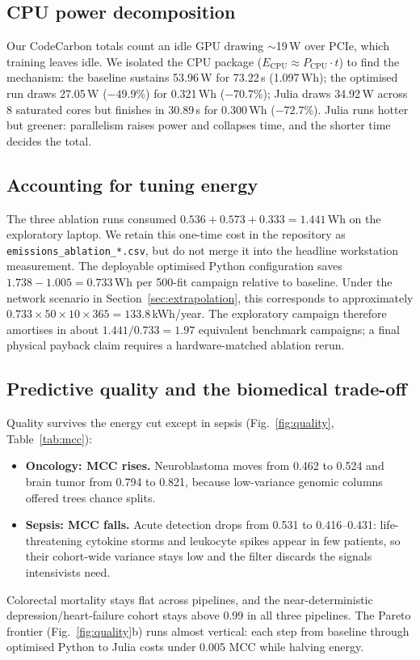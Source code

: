 \documentclass[11pt,a4paper]{article}
\newcommand{\code}[1]{\texttt{\small\color{primarydark}#1}}
\begin{document}
\subsection{CPU power decomposition}
Our CodeCarbon totals count an idle GPU drawing $\sim$19\,W over PCIe, which
training leaves idle. We isolated the CPU package ($E_{\mathrm{CPU}}\approx
P_{\mathrm{CPU}}\cdot t$) to find the mechanism: the baseline sustains
53.96\,W for 73.22\,s (1.097\,Wh); the optimised run draws 27.05\,W
($-49.9$\%) for 0.321\,Wh ($-70.7$\%); Julia draws 34.92\,W across 8 saturated
cores but finishes in 30.89\,s for 0.300\,Wh ($-72.7$\%). Julia runs hotter
but greener: parallelism raises power and collapses time, and the shorter time
decides the total.

\subsection{Accounting for tuning energy}
The three ablation runs consumed $0.536+0.573+0.333=1.441$\,Wh on the
exploratory laptop. We retain this one-time cost in the repository as
\code{emissions\_ablation\_*.csv}, but do not merge it into the headline
workstation measurement. The deployable optimised Python configuration saves
$1.738-1.005=0.733$\,Wh per 500-fit campaign relative to baseline. Under the
network scenario in Section~\ref{sec:extrapolation}, this corresponds to
approximately $0.733\times50\times10\times365=133.8$\,kWh/year. The
exploratory campaign therefore amortises in about $1.441/0.733=1.97$
equivalent benchmark campaigns; a final physical payback claim requires a
hardware-matched ablation rerun.

\subsection{Predictive quality and the biomedical trade-off}
Quality survives the energy cut except in sepsis (Fig.~\ref{fig:quality}, Table~\ref{tab:mcc}):
\begin{itemize}
\item \textbf{Oncology: MCC rises.} Neuroblastoma moves from 0.462 to 0.524 and brain tumor from 0.794 to 0.821, because low-variance genomic columns offered trees chance splits.
\item \textbf{Sepsis: MCC falls.} Acute detection drops from 0.531 to 0.416--0.431: life-threatening cytokine storms and leukocyte spikes appear in few patients, so their cohort-wide variance stays low and the filter discards the signals intensivists need.
\end{itemize}
Colorectal mortality stays flat across pipelines, and the near-deterministic depression/heart-failure cohort stays above 0.99 in all three pipelines. The Pareto frontier (Fig.~\ref{fig:quality}b) runs almost vertical: each step from baseline through optimised Python to Julia costs under 0.005 MCC while halving energy.
\end{document}

